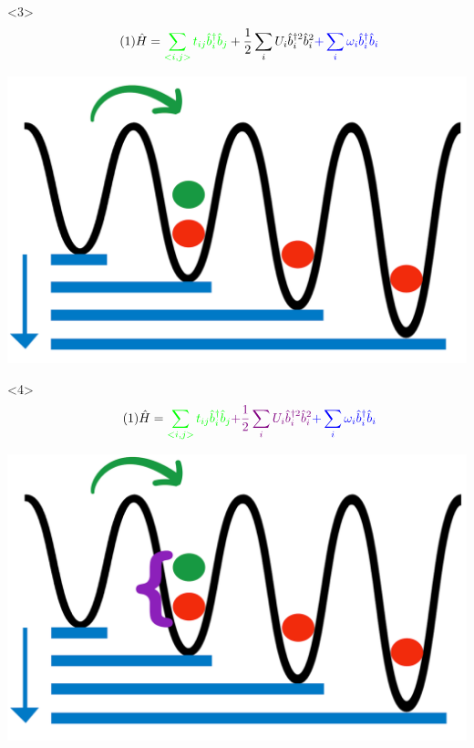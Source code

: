 \documentclass[aspectratio=169]{beamer}
\begin{document}
\begin{frame}
\begin{onlyenv}
\begin{center}
  \end{center}
\end{onlyenv}
\begin{onlyenv}<3>
  \begin{equation}\tag{1}
    \hat{H} = \textcolor{green}{\sum_{<i,j>} t_{ij}\hat{b}_i^\dagger \hat{b}_j} + \frac{1}{2}\sum_i U_i\hat{b}_i^{\dagger 2} \hat{b}_i^{2} \textcolor{blue}{+ \sum_i \omega_i \hat{b}_i^\dagger \hat{b}_i}
  \end{equation}
  \begin{center}
    \includegraphics[scale=0.1]{../img/t.png}
  \end{center}
\end{onlyenv}
\begin{onlyenv}<4>
  \begin{equation}\tag{1}
    \hat{H} = \textcolor{green}{\sum_{<i,j>} t_{ij}\hat{b}_i^\dagger \hat{b}_j} \textcolor{violet}{+ \frac{1}{2}\sum_i U_i\hat{b}_i^{\dagger 2} \hat{b}_i^{2}} \textcolor{blue}{+ \sum_i \omega_i \hat{b}_i^\dagger \hat{b}_i}
  \end{equation}
  \begin{center}
    \includegraphics[scale=0.1]{../img/U.png}
  \end{center}
\end{onlyenv}
\end{frame}
\end{document}
